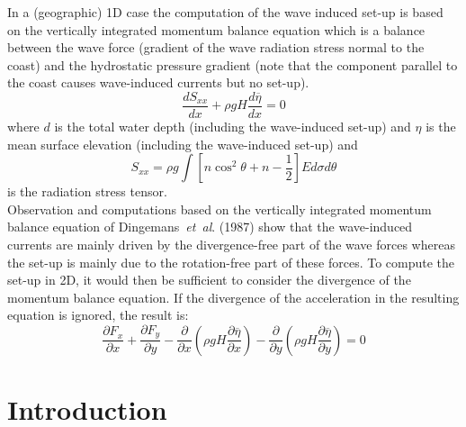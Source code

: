 \documentclass[12pt]{book}
\begin{document}
In a (geographic) 1D case the computation of the wave induced set-up is based on the vertically integrated
momentum balance equation which is a balance between the wave force (gradient of the wave radiation
stress normal to the coast) and the hydrostatic pressure gradient (note that the component parallel to the
coast causes wave-induced currents but no set-up).
\begin{equation}
  \frac{dS_{xx}}{dx} + \rho g H \frac{d \overline{\eta}}{dx} = 0
  \label{eq3-39}
\end{equation}
where $d$ is the total water depth (including the wave-induced set-up) and $\eta$ is the mean surface elevation
(including the wave-induced set-up) and
\begin{equation}
   S_{xx} = \rho g \int [n \cos^2 \theta + n - \frac{1}{2}]E d \sigma d\theta
  \label{eq3-40}
\end{equation}
is the radiation stress tensor.
\\[2ex]
\noindent
Observation and computations based on the vertically integrated momentum balance equation of
Dingemans~{\it et~al}. (1987) show that the wave-induced currents are mainly driven by the divergence-free
part of the wave forces whereas the set-up is mainly due to the rotation-free part of these forces. To
compute the set-up in 2D, it would then be sufficient to consider the divergence of the momentum balance
equation. If the divergence of the acceleration in the resulting equation is ignored, the result is:
\begin{equation}
  \frac{\partial F_x}{\partial x} + \frac{\partial F_y}{\partial y} -
  \frac{\partial}{\partial x} (\rho g H \frac{\partial \overline{\eta}}{\partial x}) -
  \frac{\partial}{\partial y} (\rho g H \frac{\partial \overline{\eta}}{\partial y}) = 0
  \label{eq3-41}
\end{equation}

 \label{ch:numerics}

\section{Introduction} \label{sec:intnum}
\end{document}

